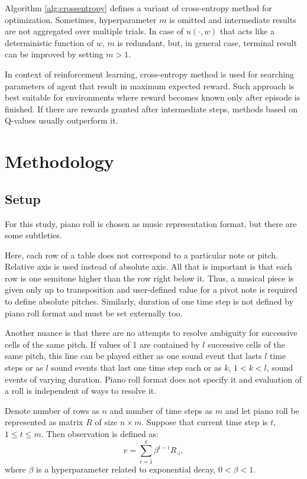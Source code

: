 \documentclass{article}
\begin{document}
Algorithm \ref{alg:crossentropy} defines a variant of cross-entropy method for optimization. Sometimes, hyperparameter $m$ is omitted and intermediate results are not aggregated over multiple trials. In case of $u(\cdot, w)$ that acts like a deterministic function of $w$, $m$ is redundant, but, in general case, terminal result can be improved by setting $m > 1$.

In context of reinforcement learning, cross-entropy method is used for searching parameters of agent that result in maximum expected reward. Such approach is best suitable for environments where reward becomes known only after episode is finished. If there are rewards granted after intermediate steps, methods based on Q-values usually outperform it.


\section{Methodology}
\label{sec:methodology}

\subsection{Setup}
\label{subsec:setup}

For this study, piano roll is chosen as music representation format, but there are some subtleties.

Here, each row of a table does not correspond to a particular note or pitch. Relative axis is used instead of absolute axis. All that is important is that each row is one semitone higher than the row right below it. Thus, a musical piece is given only up to transposition and user-defined value for a pivot note is required to define absolute pitches. Similarly, duration of one time step is not defined by piano roll format and must be set externally too.

Another nuance is that there are no attempts to resolve ambiguity for successive cells of the same pitch. If values of 1 are contained by $l$ successive cells of the same pitch, this line can be played either as one sound event that lasts $l$ time steps or as $l$ sound events that last one time step each or as $k$, $1 < k < l$, sound events of varying duration. Piano roll format does not specify it and evaluation of a roll is independent of ways to resolve it.

Denote number of rows as $n$ and number of time steps as $m$ and let piano roll be represented as matrix $R$ of size $n \times m$. Suppose that current time step is $t$, $1 \le t \le m$. Then observation is defined as:
$$v = \sum_{i = 1}^t \beta^{t - i} R_{\cdot i},$$
where $\beta$ is a hyperparameter related to exponential decay, $0 < \beta < 1$.
\end{document}
